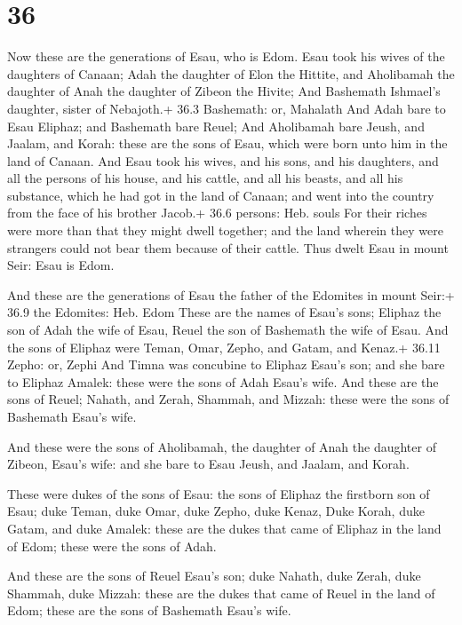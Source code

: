 \hypertarget{section-35}{%
\section{36}\label{section-35}}

 Now these are the generations of Esau, who is Edom.
 Esau took his wives of the daughters of Canaan; Adah the
daughter of Elon the Hittite, and Aholibamah the daughter of Anah the
daughter of Zibeon the Hivite;  And Bashemath Ishmael's
daughter, sister of Nebajoth.+ 36.3 Bashemath: or, Mahalath 
And Adah bare to Esau Eliphaz; and Bashemath bare Reuel; 
And Aholibamah bare Jeush, and Jaalam, and Korah: these are the sons of
Esau, which were born unto him in the land of Canaan.  And
Esau took his wives, and his sons, and his daughters, and all the
persons of his house, and his cattle, and all his beasts, and all his
substance, which he had got in the land of Canaan; and went into the
country from the face of his brother Jacob.+ 36.6 persons: Heb. souls
 For their riches were more than that they might dwell
together; and the land wherein they were strangers could not bear them
because of their cattle.  Thus dwelt Esau in mount Seir:
Esau is Edom.

 And these are the generations of Esau the father of the
Edomites in mount Seir:+ 36.9 the Edomites: Heb. Edom 
These are the names of Esau's sons; Eliphaz the son of Adah the wife of
Esau, Reuel the son of Bashemath the wife of Esau.  And the
sons of Eliphaz were Teman, Omar, Zepho, and Gatam, and Kenaz.+ 36.11
Zepho: or, Zephi  And Timna was concubine to Eliphaz Esau's
son; and she bare to Eliphaz Amalek: these were the sons of Adah Esau's
wife.  And these are the sons of Reuel; Nahath, and Zerah,
Shammah, and Mizzah: these were the sons of Bashemath Esau's wife.

 And these were the sons of Aholibamah, the daughter of
Anah the daughter of Zibeon, Esau's wife: and she bare to Esau Jeush,
and Jaalam, and Korah.

 These were dukes of the sons of Esau: the sons of
Eliphaz the firstborn son of Esau; duke Teman, duke Omar, duke Zepho,
duke Kenaz,  Duke Korah, duke Gatam, and duke Amalek: these
are the dukes that came of Eliphaz in the land of Edom; these were the
sons of Adah.

 And these are the sons of Reuel Esau's son; duke Nahath,
duke Zerah, duke Shammah, duke Mizzah: these are the dukes that came of
Reuel in the land of Edom; these are the sons of Bashemath Esau's wife.

